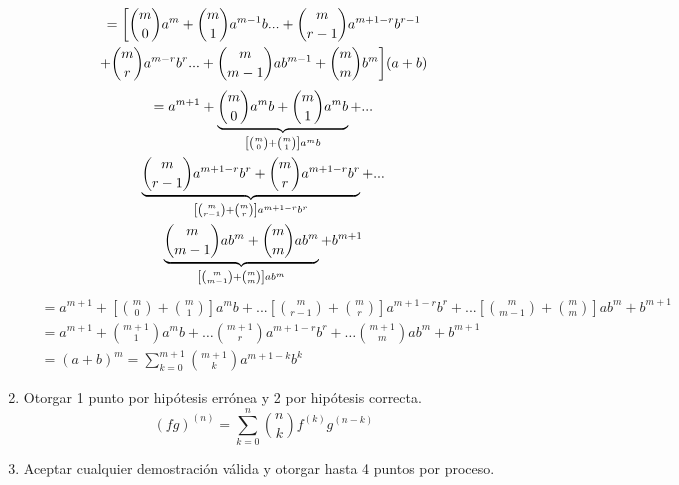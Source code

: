 \documentclass[spanish,12pt]{article}
\begin{document}
\begin{enumerate}[$a)$]
\begin{multline}
        =\biggl[{m\choose{0}}a^m+{m\choose{1}}a^{m-1}b...+{m\choose{r-1}}a^{m+1-r}b^{r-1}\\
        +{m\choose{r}}a^{m-r}b^{r}...+{m\choose{m-1}}ab^{m-1}+{m\choose{m}}b^{m}\biggl](a+b)\notag
\end{multline}
\begin{multline}
        =a^{m+1} + \underbrace{ {m\choose{0}}a^mb+{m\choose{1}}a^{m}b}_{\left[{m\choose{0}}+{m\choose{1}}\right]a^mb}+...\\\underbrace{{m\choose{r-1}}a^{m+1-r}b^{r}+{m\choose{r}}a^{m+1-r}b^{r}}_{\left[{m\choose{r-1}}+{m\choose{r}}\right]a^{m+1-r}b^r}+...\\\underbrace{{m\choose{m-1}}ab^{m}+{m\choose{m}}ab^{m}}_{\left[{m\choose{m-1}}+{m\choose{m}}\right]ab^m}+b^{m+1}\notag
\end{multline}
\begin{align*}
    &=a^{m+1}+\left[{m\choose{0}}+{m\choose{1}}\right]a^mb+...\left[{m\choose{r-1}}+{m\choose{r}}\right]a^{m+1-r}b^r+...\left[{m\choose{m-1}}+{m\choose{m}}\right]ab^m+b^{m+1}\\
    &=a^{m+1}+{m+1\choose{1}}a^mb+\dots{m+1\choose{r}}a^{m+1-r}b^r+\dots{m+1\choose{m}}ab^m+b^{m+1}\\
    &=(a+b)^{m}=\sum_{k=0}^{m+1}{m+1\choose{k}}a^{m+1-k}b^{k}
\end{align*}

    \item Otorgar 1 punto por hipótesis errónea y 2 por hipótesis correcta.
    $$(fg)^{(n)}=\sum_{k=0}^n{n\choose{k}}f^{(k)}g^{(n-k)}$$
    \item Aceptar cualquier demostración válida y otorgar hasta 4 puntos por proceso.
\end{enumerate}
\end{document}

